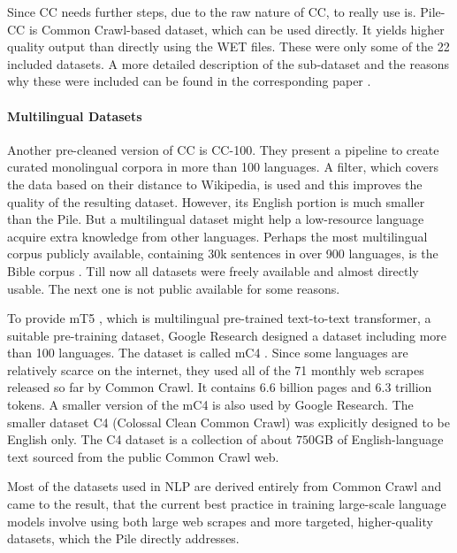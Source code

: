\documentclass[
]{krantz}
\begin{document}
Since CC needs further steps, due to the raw nature of CC, to really use is. Pile-CC is Common Crawl-based dataset, which can be used directly. It yields higher quality output than directly using the WET files.
These were only some of the 22 included datasets. A more detailed description of the sub-dataset and the reasons why these were included can be found in the corresponding paper \citep{gao2020pile}.

\hypertarget{multilingual-datasets}{%
\paragraph{Multilingual Datasets}\label{multilingual-datasets}}

Another pre-cleaned version of CC is CC-100\citep{wenzek2019ccnet}. They present a pipeline to create curated monolingual corpora in more than 100 languages. A filter, which covers the data based on their distance to Wikipedia, is used and this improves the quality of the resulting dataset. However, its English portion is much smaller than the Pile. But a multilingual dataset might help a low-resource language acquire extra knowledge from other languages.
Perhaps the most multilingual corpus publicly available, containing 30k sentences in over 900 languages, is the Bible corpus \citep{mayer2014creating}.
Till now all datasets were freely available and almost directly usable. The next one is not public available for some reasons.

To provide mT5 \citep{xue2020mt5}, which is multilingual pre-trained text-to-text transformer, a suitable pre-training dataset, Google Research designed a dataset including more than 100 languages. The dataset is called mC4 \citep{xue2020mt5}. Since some languages are relatively scarce on the internet, they used all of the 71 monthly web scrapes released so far by Common Crawl. It contains 6.6 billion pages and 6.3 trillion tokens. A smaller version of the mC4 is also used by Google Research. The smaller dataset C4 (Colossal Clean Common Crawl) was explicitly designed to be English only. The C4 dataset is a collection of about \(750\)GB of English-language text sourced from the public Common Crawl web.

Most of the datasets used in NLP are derived entirely from Common Crawl and \citet{rosset2020turing} came to the result, that the current best practice in training large-scale language models involve using both large web scrapes and more targeted, higher-quality datasets, which the Pile directly addresses.
\end{document}
